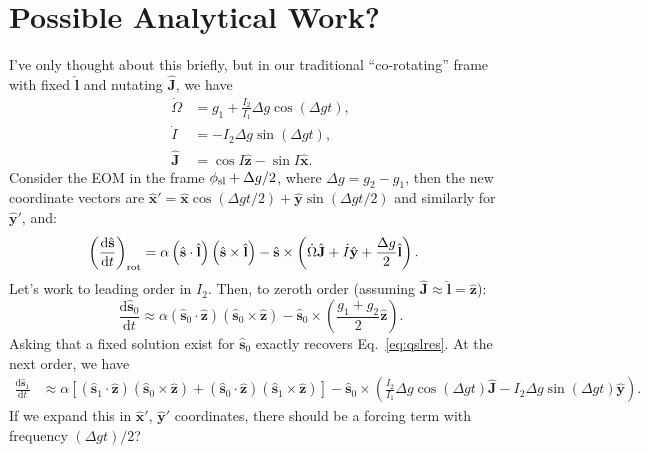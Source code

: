 \documentclass[11pt,
        usenames, %
        dvipsnames %
    ]{article}
\newcommand*{\rd}[2]{\frac{\mathrm{d}#1}{\mathrm{d}#2}}
\newcommand*{\bm}[1]{\boldsymbol{\mathbf{#1}}}
\newcommand*{\uv}[1]{\hat{\bm{#1}}}
\newcommand*{\p}[1]{\left(#1\right)}
\newcommand*{\s}[1]{\left[#1\right]}
\begin{document}
\section{Possible Analytical Work?}

I've only thought about this briefly, but in our traditional ``co-rotating''
frame with fixed $\uv{l}$ and nutating $\uv{J}$, we have
\begin{align}
    \dot{\Omega} &= g_1 + \frac{I_2}{I_1} \Delta g \cos\p{\Delta g t},\\
    \dot{I} &= -I_2 \Delta g \sin\p{\Delta g t},\\
    \uv{J} &= \cos I \uv{z} - \sin I \uv{x}.
\end{align}
Consider the EOM in the frame $\phi_{\rm sl} + \Delta g / 2$, where $\Delta g =
g_2 - g_1$, then the new coordinate vectors are $\uv{x}' = \uv{x} \cos\p{\Delta
g t / 2} + \uv{y} \sin\p{\Delta g t / 2}$ and similarly for $\uv{y}'$, and:
\begin{align}
    \p{\rd{\uv{s}}{t}}_{\rm rot} &= \alpha\p{\uv{s} \cdot \uv{l}}
            \p{\uv{s} \times \uv{l}}
            - \uv{s} \times \p{\dot{\Omega} \uv{J} + \dot{I}\uv{y}
                + \frac{\Delta g}{2}\uv{l}}.
\end{align}
Let's work to leading order in $I_2$. Then, to zeroth order (assuming $\uv{J}
\approx \uv{l} = \uv{z}$):
\begin{equation}
    \rd{\uv{s}_0}{t}
        \approx \alpha\p{\uv{s}_0 \cdot \uv{z}}\p{\uv{s}_0 \times \uv{z}}
            - \uv{s}_0 \times \p{\frac{g_1 + g_2}{2}\uv{z}}.
\end{equation}
Asking that a fixed solution exist for $\uv{s}_0$ exactly recovers
Eq.~\eqref{eq:qslres}. At the next order, we have
\begin{align}
    \rd{\uv{s}_1}{t} &\approx
        \alpha\s{\p{\uv{s}_1 \cdot \uv{z}}\p{\uv{s}_0 \times \uv{z}}
        + \p{\uv{s}_0 \cdot \uv{z}}\p{\uv{s}_1 \times \uv{z}}}
        - \uv{s}_0 \times \p{\frac{I_2}{I_1} \Delta g \cos\p{\Delta g t}
            \uv{J} - I_2 \Delta g \sin\p{\Delta g t}\uv{y}}.
\end{align}
If we expand this in $\uv{x}'$, $\uv{y}'$ coordinates, there should be a forcing
term with frequency $\p{\Delta g t} / 2$?
\end{document}
